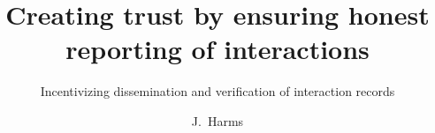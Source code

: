 \documentclass[whitelogo]{tudelft-report}
\theoremstyle{plain}
\theoremstyle{definition}
\begin{document}
\frontmatter


\title[tudelft-white]{Creating trust by ensuring honest reporting of interactions}
\subtitle[tudelft-black]{Incentivizing dissemination and verification of interaction records}
\author[tudelft-white]{J.\ Harms}
\makecover[split]






\tableofcontents

\mainmatter













% 





\appendix

%


\end{document}
